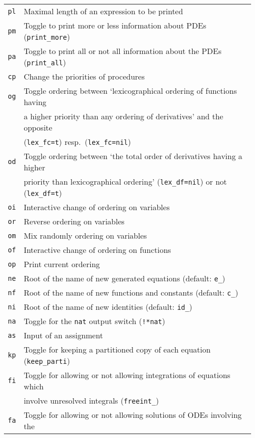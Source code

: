 \begin{longtable}[l]{ll}
  \texttt{pl} & Maximal length of an expression to be printed \\
  \texttt{pm} & Toggle to print more or less information about PDEs (\texttt{print\_more}) \\
  \texttt{pa} & Toggle to print all or not all information about the PDEs (\texttt{print\_all}) \\
  \texttt{cp} & Change the priorities of procedures \\
  \texttt{og} & Toggle ordering between `lexicographical ordering of functions having \\
  & a higher priority than any ordering of derivatives' and the opposite \\
  & (\texttt{lex\_fc=t}) resp.\ (\texttt{lex\_fc=nil}) \\
  \texttt{od} & Toggle ordering between `the total order of derivatives having a higher \\
  & priority than lexicographical ordering' (\texttt{lex\_df=nil}) or not (\texttt{lex\_df=t}) \\
  \texttt{oi} & Interactive change of ordering on variables \\
  \texttt{or} & Reverse ordering on variables \\
  \texttt{om} & Mix randomly ordering on variables \\
  \texttt{of} & Interactive change of ordering on functions \\
  \texttt{op} & Print current ordering \\
  \texttt{ne} & Root of the name of new generated equations (default: \texttt{e\_}) \\
  \texttt{nf} & Root of the name of new functions and constants (default: \texttt{c\_}) \\
  \texttt{ni} & Root of the name of new identities (default: \texttt{id\_}) \\
  \texttt{na} & Toggle for the \texttt{nat} output switch (\texttt{!*nat}) \\
  \texttt{as} & Input of an assignment \\
  \texttt{kp} & Toggle for keeping a partitioned copy of each equation (\texttt{keep\_parti}) \\
  \texttt{fi} & Toggle for allowing or not allowing integrations of equations which \\
  & involve unresolved integrals (\texttt{freeint\_}) \\
  \texttt{fa} & Toggle for allowing or not allowing solutions of ODEs involving the \\

\end{longtable}
